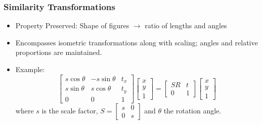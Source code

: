 \documentclass[8pt, a4paper, landscape, includeheadfoot]{extarticle}
\begin{document}
\begin{multicols*}{4}
	\subsubsection{Similarity Transformations}{}
	\begin{itemize}[itemsep=0pt, leftmargin=8pt]
		\item Property Preserved: Shape of figures $\to$ ratio of lengths and angles
		\item Encompasses isometric transformations along with scaling; angles and relative proportions are maintained.
		\item Example:
		      $$
			      \begin{bmatrix}
				      s \cos \theta & -s \sin \theta & t_x \\
				      s \sin \theta & s \cos \theta  & t_y \\
				      0             & 0              & 1
			      \end{bmatrix}
			      \begin{bmatrix}
				      x \\ y \\ 1
			      \end{bmatrix} =
			      \begin{bmatrix}
				      SR & t \\
				      0  & 1
			      \end{bmatrix}
			      \begin{bmatrix}
				      x \\ y \\ 1
			      \end{bmatrix}
		      $$
		      where \( s \) is the scale factor, $S = \begin{bmatrix}
				      s & 0 \\
				      0 & s
			      \end{bmatrix}$ and  \( \theta \) the rotation angle.
	\end{itemize}

	\Umbruch


\end{multicols*}
\end{document}
